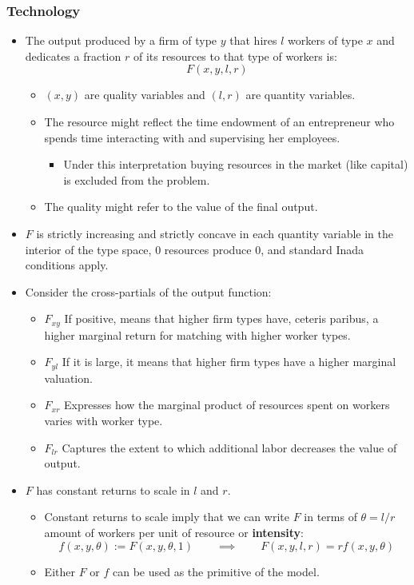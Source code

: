 \documentclass[12pt]{article}
\theoremstyle{definition}
\newcommand{\qiq}{\qquad \implies \qquad}
\begin{document}
\subsubsection{Technology}
\begin{itemize}
    \item The output produced by a firm of type $y$ that hires $l$ workers of type $x$ and dedicates a fraction $r$ of its resources to that type of workers is:$$F(x,y,l,r)$$
    \begin{itemize}
        \item $(x,y)$ are quality variables and $(l,r)$ are quantity variables.
	    \item The resource might reflect the time endowment of an entrepreneur who spends time interacting with and supervising her employees.
	    \begin{itemize}
		    \item Under this interpretation buying resources in the market (like capital) is excluded from the problem.
	    \end{itemize}
	    \item The quality might refer to the value of the final output.
    \end{itemize}
    \item $F$ is strictly increasing and strictly concave in each quantity variable in the interior of the type space, $0$ resources produce $0$, and standard Inada conditions apply.
     \item  Consider the cross-partials of the output function:
    \begin{itemize}
	  \item $F_{xy}$ If positive, means that higher firm types have, ceteris paribus, a higher marginal return for matching with higher worker types.
	  \item $F_{yl}$ If it is large, it means that higher firm types have a higher marginal valuation.
      \item $F_{xr}$ Expresses how the marginal product of resources spent on workers varies with worker type.
	  \item  $F_{lr}$ Captures the extent to which additional labor decreases the value of output.
    \end{itemize}

    \item  $F$ has constant returns to scale in $l$ and $r$.
    \begin{itemize}
	    \item  Constant returns to scale imply that we can write $F$ in terms of $\theta=l/r$ amount of workers per unit of resource or \textbf{intensity}:$$f(x,y,\theta):=F(x,y,\theta,1)\qiq F(x,y,l,r) = rf(x,y,\theta)$$
	    \item Either $F$ or $f$ can be used as the primitive of the model.
    \end{itemize}
\end{itemize}
\end{document}
